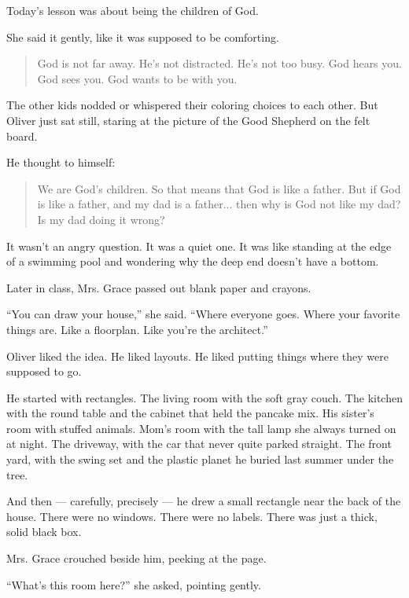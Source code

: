 Today’s lesson was about being the children of God.

She said it gently, like it was supposed to be comforting.

\begin{quote}
God is not far away. He’s not distracted. He’s not too busy. God hears you. God sees you. God wants to 
be with you.
\end{quote}

The other kids nodded or whispered their coloring choices to each other. But Oliver just sat still, 
staring at the picture of the Good Shepherd on the felt board.

He thought to himself: 
\medskip

\begin{quote}
We are God's children. So that means that God is like a father. But if God is like a father, 
and my dad is a father...  then why is God not like my dad? Is my dad doing it wrong?
\end{quote}

\medskip

It wasn’t an angry question. 
It was a quiet one. 
It was like standing at the edge of a swimming pool and wondering why the deep end doesn’t have a bottom.

Later in class, Mrs. Grace passed out blank paper and crayons.

``You can draw your house,'' she said. ``Where everyone 
goes. Where your favorite things are. Like a floorplan. Like you're the architect.''

Oliver liked the idea. He liked layouts. He liked putting things where they were supposed to go.

He started with rectangles.  
The living room with the soft gray couch.  
The kitchen with the round table and the cabinet that held the pancake mix.  
His sister’s room with stuffed animals.  
Mom’s room with the tall lamp she always turned on at night.  
The driveway, with the car that never quite parked straight.  
The front yard, with the swing set and the plastic planet he buried last summer under the tree.

And then — carefully, precisely — he drew a small rectangle near the back of the house. 
There were no windows. 
There were no labels. 
There was just a thick, solid black box.

Mrs. Grace crouched beside him, peeking at the page.

``What’s this room here?'' she asked, pointing gently.

